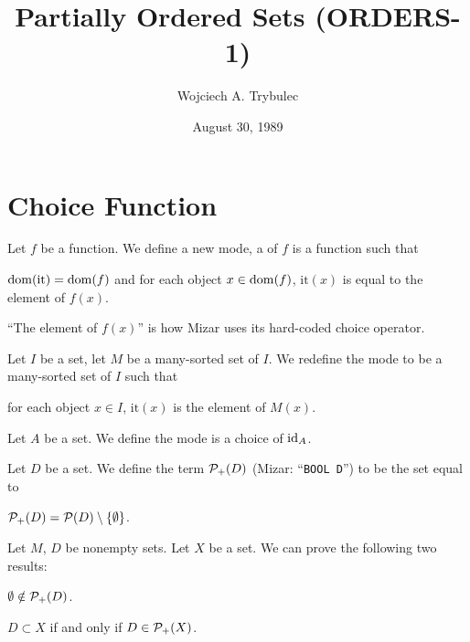 \documentclass{article}
\title{Partially Ordered Sets (ORDERS-1)}
\author{Wojciech A. Trybulec}
\date{August 30, 1989}
\begin{document}
\maketitle

\section{Choice Function}

\begin{definition}
Let $f$ be a function.
We define a new mode, a  of $f$ is a function such that
\begin{defn}
\item $\operatorname{dom}(\mbox{it})=\operatorname{dom}(f)$ and for each object $x\in\operatorname{dom}(f)$,
  $\mbox{it}(x)$ is equal to the element of $f(x)$.
\end{defn}
\end{definition}

\begin{remark}
``The element of $f(x)$'' is how Mizar uses its hard-coded choice operator.
\end{remark}

\begin{definition}
Let $I$ be a set, let $M$ be a many-sorted set of $I$.
We redefine the mode  to be a many-sorted set of
$I$ such that
\begin{defn}
\item for each object $x\in I$, $\mbox{it}(x)$ is the element of $M(x)$.
\end{defn}
\end{definition}

\begin{definition}
Let $A$ be a set.
We define the mode  is a choice of $\operatorname{id}_{A}$.
\end{definition}

\begin{definition}
Let $D$ be a set. We define the term $\mathcal{P}_{+}(D)$ (Mizar: ``\verb#BOOL D#'')
to be the set equal to
\begin{defn}
\item $\mathcal{P}_{+}(D)=\mathcal{P}(D)\setminus\{\emptyset\}$.
\end{defn}
\end{definition}

Let $M$, $D$ be nonempty sets. Let $X$ be a set.
We can prove the following two results:
\begin{thm}
\item\label{orders1:1} $\emptyset\notin\mathcal{P}_{+}(D)$.
\item\label{orders1:2} $D\subset X$ if and only if $D\in\mathcal{P}_{+}(X)$.
\end{thm}
\end{document}
